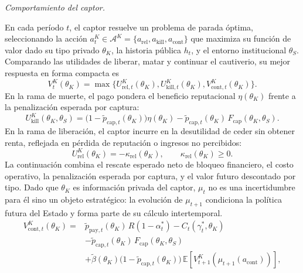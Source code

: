 \documentclass[pdflatex,sn-mathphys-ay]{sn-jnl}
\theoremstyle{thmstyleone}
\theoremstyle{thmstyletwo}
\theoremstyle{thmstylethree}
\newcommand{\E}{\mathbb{E}}
\newcommand{\1}{\mathbf{1}}
\begin{document}
\noindent\textit{Comportamiento del captor.}

\noindent En cada período $t$, el captor resuelve un problema de parada óptima, seleccionando la acción $a_t^K\in\mathcal{A}^K=\{a_{\mathrm{rel}},a_{\mathrm{kill}},a_{\mathrm{cont}}\}$ que maximiza su función de valor dado su tipo privado $\theta_K$, la historia pública $h_t$, y el entorno institucional $\theta_S$. Comparando las utilidades de liberar, matar y continuar el cautiverio, su mejor respuesta en forma compacta es
\begin{equation}
V^K_t(\theta_K)=
\max\{U^K_{\mathrm{rel},t}(\theta_K),
U^K_{\mathrm{kill},t}(\theta_K),
V^K_{\mathrm{cont},t}(\theta_K)\}.
\label{eq:k-bellman}
\end{equation}
En la rama de muerte, el pago pondera el beneficio reputacional $\eta(\theta_K)$ frente a la penalización esperada por captura:
\begin{equation}
U^K_{\mathrm{kill}}(\theta_K,\theta_S)=\bigl(1-\tilde{p}_{\mathrm{cap},t}(\theta_K)\bigr)\eta(\theta_K)-\tilde{p}_{\mathrm{cap},t}(\theta_K)\,F_{\mathrm{cap}}(\theta_K,\theta_S).
\label{eq:k-kill}
\end{equation}
En la rama de liberación, el captor incurre en la desutilidad de ceder sin obtener renta, reflejada en pérdida de reputación o ingresos no percibidos:
\begin{equation}
U^K_{\mathrm{rel}}(\theta_K)=-\kappa_{\mathrm{rel}}(\theta_K),\qquad\kappa_{\mathrm{rel}}(\theta_K)\ge 0.
\label{eq:k-rel}
\end{equation}
La continuación combina el rescate esperado neto de bloqueo financiero, el costo operativo, la penalización esperada por captura, y el valor futuro descontado por tipo. Dado que $\theta_K$ es información privada del captor, $\mu_t$ no es una incertidumbre para él sino un objeto estratégico: la evolución de $\mu_{t+1}$ condiciona la política futura del Estado y forma parte de su cálculo intertemporal.
\begin{equation}
\begin{aligned}
V^K_{\mathrm{cont},t}(\theta_K)
={}&\tilde{p}_{\mathrm{pay},t}(\theta_K)\,R(1-\alpha_t^\ast)
-C_t(\gamma_t^\ast,\theta_K)\\
&-\tilde{p}_{\mathrm{cap},t}(\theta_K)\,F_{\mathrm{cap}}(\theta_K,\theta_S)\\
&+\tilde{\beta}(\theta_K)\bigl(1-\tilde{p}_{\mathrm{cap},t}(\theta_K)\bigr)\,\E\!\left[V^K_{t+1}\!\left(\mu_{t+1}(a_{\mathrm{cont}})\right)\right],
\end{aligned}
\label{eq:kidnapper-cont}
\end{equation}
\end{document}
